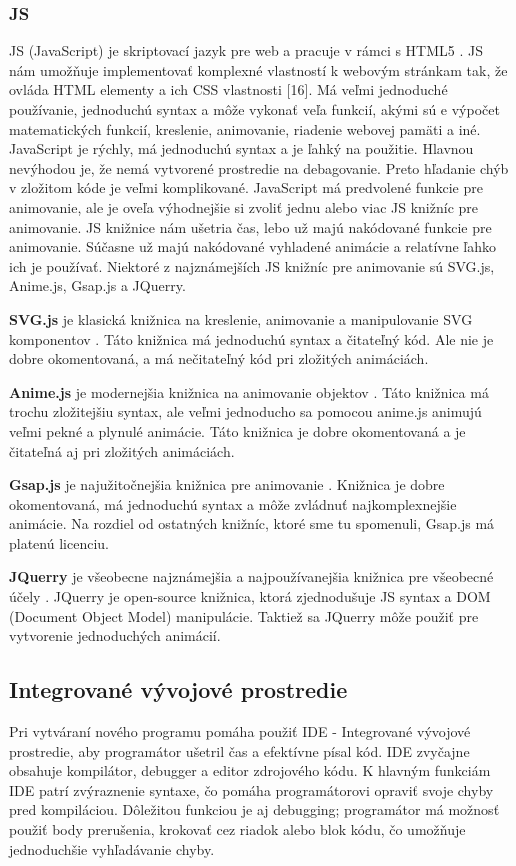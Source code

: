 \subsubsection{JS}
\noindent \acrshort{JS} (JavaScript) je skriptovací jazyk pre web a pracuje v rámci s HTML5 \cite{c3}. JS nám umožňuje implementovať komplexné vlastností k webovým stránkam tak, že ovláda HTML elementy a ich CSS vlastnosti [16]. Má veľmi jednoduché používanie, jednoduchú syntax a môže vykonať veľa funkcií, akými sú e výpočet matematických funkcií, kreslenie, animovanie, riadenie webovej pamäti a iné. JavaScript je rýchly, má jednoduchú syntax a je ľahký na použitie. Hlavnou nevýhodou je, že nemá vytvorené prostredie na debagovanie. Preto hľadanie chýb v zložitom kóde je veľmi komplikované. JavaScript má predvolené funkcie pre animovanie, ale je oveľa výhodnejšie si zvoliť jednu alebo viac JS knižníc pre animovanie. JS knižnice nám ušetria čas, lebo už majú nakódované funkcie pre animovanie. Súčasne už majú nakódované vyhladené animácie a relatívne ľahko ich je  používať. Niektoré z najznámejších JS knižníc pre animovanie sú SVG.js, Anime.js, Gsap.js a JQuerry.

\noindent
\textbf{SVG.js} je klasická knižnica na kreslenie, animovanie a manipulovanie \acrshort{SVG} komponentov \cite{c5}. Táto knižnica má jednoduchú syntax a čitateľný kód. Ale nie je dobre okomentovaná, a má nečitateľný kód pri zložitých animáciách.

\noindent
\textbf{Anime.js} je modernejšia knižnica na animovanie objektov \cite{c6}. Táto knižnica má trochu zložitejšiu syntax, ale veľmi jednoducho sa pomocou anime.js animujú veľmi pekné a plynulé animácie. Táto knižnica je dobre okomentovaná a je čitateľná aj pri zložitých animáciách.

\noindent
\textbf{Gsap.js} je najužitočnejšia knižnica pre animovanie \cite{c7}. Knižnica je dobre okomentovaná, má jednoduchú syntax a môže zvládnuť najkomplexnejšie animácie. Na rozdiel od ostatných knižníc, ktoré sme tu spomenuli, Gsap.js má platenú licenciu.

\noindent
\textbf{JQuerry} je všeobecne najznámejšia a najpoužívanejšia knižnica pre všeobecné účely \cite{c8}. JQuerry je open-source knižnica, ktorá zjednodušuje JS syntax a \acrshort{DOM} (Document Object Model) manipulácie. Taktiež sa JQuerry môže použiť pre vytvorenie jednoduchých animácií. 

\subsection{Integrované vývojové prostredie}
Pri vytváraní nového programu pomáha použiť \acrshort{IDE} - Integrované vývojové prostredie, aby programátor ušetril čas a efektívne  písal kód. IDE zvyčajne obsahuje kompilátor, debugger a editor zdrojového kódu. K hlavným funkciám IDE patrí zvýraznenie syntaxe, čo pomáha programátorovi opraviť svoje chyby pred kompiláciou. Dôležitou funkciou je aj debugging; programátor má možnosť použiť body prerušenia, krokovať cez riadok alebo blok kódu, čo umožňuje jednoduchšie vyhľadávanie chyby.


